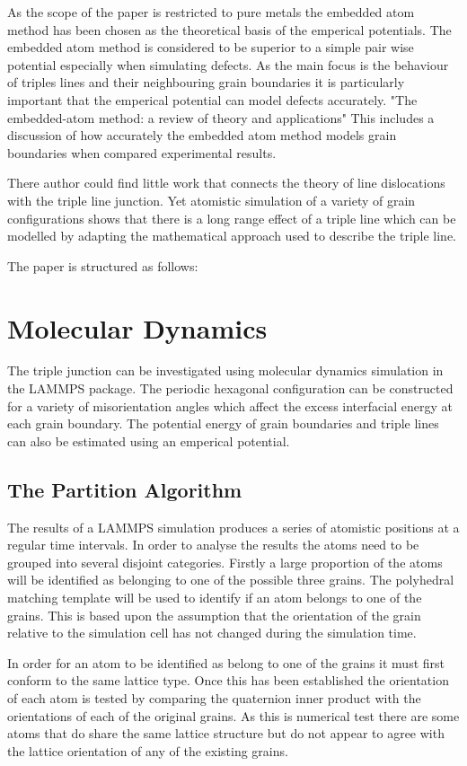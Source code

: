 \documentclass[12pt,a4paper]{book}
\begin{document}
As the scope of the paper is restricted to pure metals the embedded atom method has been chosen as the theoretical basis of the emperical potentials. The embedded atom method is considered to be superior to a simple pair wise potential especially when simulating defects. As the main focus is the behaviour of triples lines and their neighbouring grain boundaries it is particularly important that the emperical potential can model defects accurately. "The embedded-atom method:
a review of theory and applications" This includes a discussion of how accurately the embedded atom method models grain boundaries when compared  experimental results.

There author could find little work that connects the theory of line dislocations with the triple line junction. Yet atomistic simulation of a variety of grain configurations shows that there is a long range effect of a triple line which can be modelled by adapting the mathematical approach used to describe the triple line.  

The paper is structured as follows:

 


\chapter{Molecular Dynamics}
The triple junction can be investigated using molecular dynamics simulation in the LAMMPS package. The periodic hexagonal configuration can be constructed for a variety of misorientation angles which affect the excess interfacial energy at each grain boundary. The potential energy of grain boundaries and triple lines can also be estimated using an emperical potential.
\section{The Partition Algorithm}
The results of a LAMMPS simulation produces a series of atomistic positions at a regular time intervals. In order to analyse the results the atoms need to be grouped into several disjoint categories. Firstly a large proportion of the atoms will be identified as belonging to one of the possible three grains. The polyhedral matching template will be used to identify if an atom belongs to one of the grains. This is based upon the assumption that the orientation of the grain relative to the simulation cell has not changed during the simulation time. 

In order for an atom to be identified as belong to one of the grains it must first conform to the same lattice type. Once this has been established the orientation of each atom is tested by comparing the quaternion inner product with the orientations of each of the original grains. As this is numerical test there are some atoms that do share the same lattice structure but do not appear to agree with the lattice orientation of any of the existing grains. 
\end{document}
